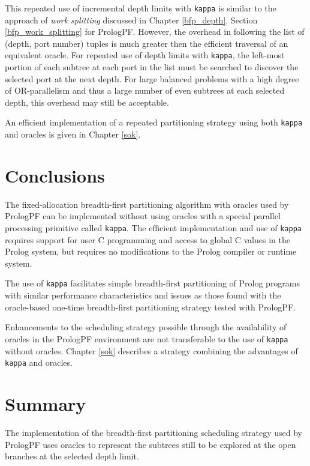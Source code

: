 This repeated use of incremental depth limits with \texttt{kappa} is similar to
the approach of \textit{work splitting} discussed in Chapter \ref{bfp_depth},
Section \ref{bfp_work_splitting} for PrologPF.  However, the overhead in following
the list of (depth, port number) tuples is much greater then the efficient traversal
of an equivalent oracle.  For repeated use of depth limits with \texttt{kappa}, the
left-most portion of each subtree at each port in the list must be searched to
discover the selected port at the next depth.  For large balanced problems with a high
degree of OR-parallelism and thus a large number of even subtrees at each selected
depth, this overhead may still be acceptable.

An efficient implementation of a repeated partitioning strategy using both \texttt{kappa}
and oracles is given in Chapter \ref{sok}.

\section{Conclusions} %

The fixed-allocation 
breadth-first partitioning algorithm with oracles used by PrologPF can be
implemented without using oracles with a special parallel processing primitive
called \texttt{kappa}.  The efficient implementation and use of \texttt{kappa} requires
support for user C programming and access to global C values in the Prolog system, but
requires no modifications to the Prolog compiler or runtime system.

The use of \texttt{kappa} facilitates simple breadth-first partitioning of Prolog
programs with similar performance
characteristics and issues as those found with the oracle-based one-time
breadth-first partitioning strategy tested with PrologPF.

Enhancements to the scheduling strategy possible through the availability of oracles in
the PrologPF environment are not transferable to the use of \texttt{kappa} without
oracles.  Chapter \ref{sok} describes a strategy combining the advantages of
\texttt{kappa} and oracles.

\section{Summary} %

The implementation of the breadth-first partitioning scheduling strategy used by
PrologPF uses oracles to represent the subtrees still to be explored at the open
branches at the selected depth limit.

